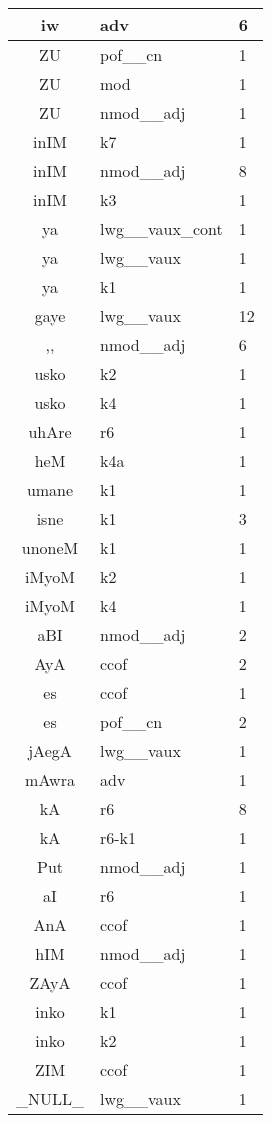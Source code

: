 \documentclass[a4 paper]{article}
\begin{document}
\begin{longtable}{cp{}p{}}
iw & adv & 6\\ \midrule 
ZU & pof\_\_cn & 1\\ \midrule ZU & mod & 1\\ \midrule ZU & nmod\_\_adj & 1\\ \midrule 
inIM & k7 & 1\\ \midrule inIM & nmod\_\_adj & 8\\ \midrule inIM & k3 & 1\\ \midrule 
ya & lwg\_\_vaux\_cont & 1\\ \midrule ya & lwg\_\_vaux & 1\\ \midrule ya & k1 & 1\\ \midrule 
gaye & lwg\_\_vaux & 12\\ \midrule 
,, & nmod\_\_adj & 6\\ \midrule 
usko & k2 & 1\\ \midrule usko & k4 & 1\\ \midrule 
uhAre & r6 & 1\\ \midrule 
heM & k4a & 1\\ \midrule 
umane & k1 & 1\\ \midrule 
isne & k1 & 3\\ \midrule 
unoneM & k1 & 1\\ \midrule 
iMyoM & k2 & 1\\ \midrule iMyoM & k4 & 1\\ \midrule 
aBI & nmod\_\_adj & 2\\ \midrule 
AyA & ccof & 2\\ \midrule 
es & ccof & 1\\ \midrule es & pof\_\_cn & 2\\ \midrule 
jAegA & lwg\_\_vaux & 1\\ \midrule 
mAwra & adv & 1\\ \midrule 
kA & r6 & 8\\ \midrule kA & r6-k1 & 1\\ \midrule 
Put & nmod\_\_adj & 1\\ \midrule 
aI & r6 & 1\\ \midrule 
AnA & ccof & 1\\ \midrule 
hIM & nmod\_\_adj & 1\\ \midrule 
ZAyA & ccof & 1\\ \midrule 
inko & k1 & 1\\ \midrule inko & k2 & 1\\ \midrule 
ZIM & ccof & 1\\ \midrule 
\_NULL\_ & lwg\_\_vaux & 1\\ \midrule 

\end{longtable}
\end{document}
